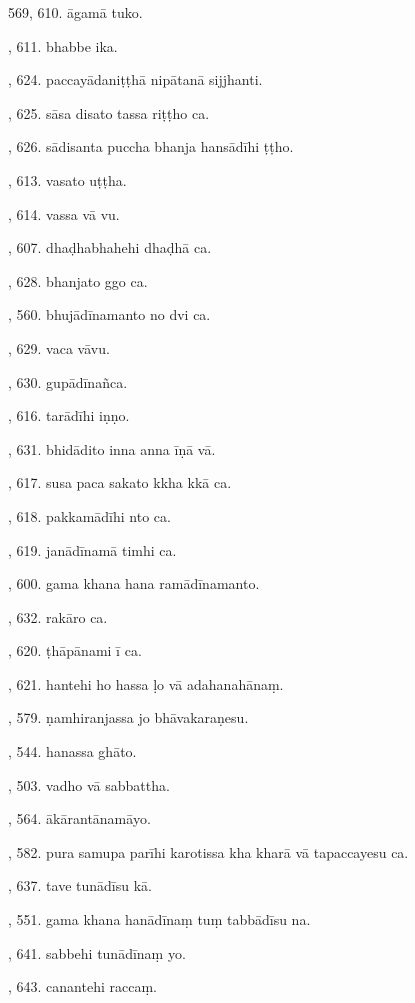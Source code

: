 569, 610. āgamā tuko.\par {}, 611. bhabbe ika.\par {}, 624. paccayādaniṭṭhā nipātanā sijjhanti.\par {}, 625. sāsa disato tassa riṭṭho ca.\par {}, 626. sādisanta puccha bhanja hansādīhi ṭṭho.\par {}, 613. vasato uṭṭha.\par {}, 614. vassa vā vu.\par {}, 607. dhaḍhabhahehi dhaḍhā ca.\par {}, 628. bhanjato ggo ca.\par {}, 560. bhujādīnamanto no dvi ca.\par {}, 629. vaca vāvu.\par {}, 630. gupādīnañca.\par {}, 616. tarādīhi iṇṇo.\par {}, 631. bhidādito inna anna īṇā vā.\par {}, 617. susa paca sakato kkha kkā ca.\par {}, 618. pakkamādīhi nto ca.\par {}, 619. janādīnamā timhi ca.\par {}, 600. gama khana hana ramādīnamanto.\par {}, 632. rakāro ca.\par {}, 620. ṭhāpānami ī ca.\par {}, 621. hantehi ho hassa ḷo vā adahanahānaṃ.\par {}, 579. ṇamhiranjassa jo bhāvakaraṇesu.\par {}, 544. hanassa ghāto.\par {}, 503. vadho vā sabbattha.\par {}, 564. ākārantānamāyo.\par {}, 582. pura samupa parīhi karotissa kha kharā vā tapaccayesu ca.\par {}, 637. tave tunādīsu kā.\par {}, 551. gama khana hanādīnaṃ tuṃ tabbādīsu na.\par {}, 641. sabbehi tunādīnaṃ yo.\par {}, 643. canantehi raccaṃ.\par \noindent
